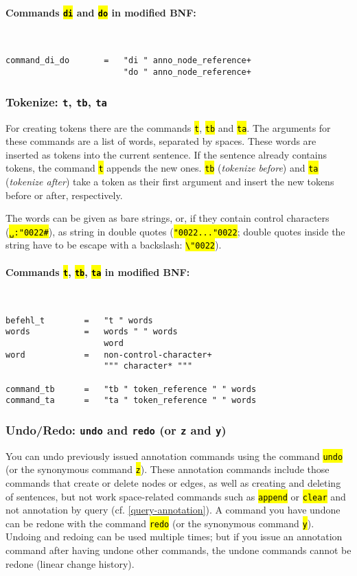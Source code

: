 \documentclass[12pt]{scrartcl}
\newcommand{\quo}{\char"0022}
\newcommand{\code}[1]{\hl{\texttt{#1}}}
\begin{document}
\paragraph*{Commands \code{di} and \code{do} in modified BNF:}
~
\begin{lstlisting}
command_di_do       =   "di " anno_node_reference+
                        "do " anno_node_reference+
\end{lstlisting}


\subsubsection{Tokenize: \texttt{t}, \texttt{tb}, \texttt{ta}}

For creating tokens there are the commands \code{t}, \code{tb} and \code{ta}.
The arguments for these commands are a list of words, separated by spaces.
These words are inserted as tokens into the current sentence.
If the sentence already contains tokens, the command \code{t} appends the new ones.
\code{tb} (\textit{tokenize before}) and \code{ta} (\textit{tokenize after}) take a token as their first argument and insert the new tokens before or after, respectively.

The words can be given as bare strings, or, if they contain control characters (\code{␣:\quo\#}), as string in double quotes (\code{\quo...\quo}; double quotes inside the string have to be escape with a backslash: \code{\textbackslash\quo}).

\paragraph*{Commands \code{t}, \code{tb}, \code{ta} in modified BNF:}
~
\begin{lstlisting}
befehl_t        =   "t " words
words           =   words " " words
                    word
word            =   non-control-character+
                    """ character* """

command_tb      =   "tb " token_reference " " words
command_ta      =   "ta " token_reference " " words
\end{lstlisting}


\subsubsection{Undo/Redo: \texttt{undo} and \texttt{redo} (or \texttt{z} and \texttt{y})}\label{befehl-undo}

You can undo previously issued annotation commands using the command \code{undo} (or the synonymous command \code{z}).
These annotation commands include those commands that create or delete nodes or edges, as well as creating and deleting of sentences, but not work space-related commands such as \code{append} or \code{clear} and not annotation by query (cf. \ref{query-annotation}).
A command you have undone can be redone with the command \code{redo} (or the synonymous command \code{y}).
Undoing and redoing can be used multiple times; but if you issue an annotation command after having undone other commands, the undone commands cannot be redone (linear change history).
\end{document}

